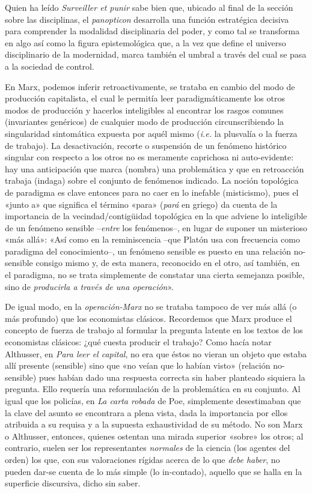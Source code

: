 Quien ha leído \emph{Surveiller et punir} sabe bien que, ubicado al final de la sección sobre las disciplinas, el \emph{panopticon} desarrolla una función estratégica decisiva para comprender la modalidad disciplinaria del poder, y como tal se transforma en algo así como la figura epistemológica que, a la vez que define el universo disciplinario de la modernidad, marca también el umbral a través del cual se pasa a la sociedad de control.

En Marx, podemos inferir retroactivamente, se trataba en cambio del modo de producción capitalista, el cual le permitía leer paradigmáticamente los otros modos de producción y hacerlos inteligibles al encontrar los rasgos comunes (invariantes genéricos) de cualquier modo de producción circunscribiendo la singularidad sintomática expuesta por aquél mismo (\emph{i.e.} la plusvalía o la fuerza de trabajo). La desactivación, recorte o suspensión de un fenómeno histórico singular con respecto a los otros no es meramente caprichosa ni auto-evidente: hay una anticipación que marca (nombra) una problemática y que en retroacción trabaja (indaga) sobre el conjunto de fenómenos indicado. La noción topológica de paradigma es clave entonces para no caer en lo inefable (misticismo), pues el «junto a» que significa el término «para» (\emph{pará }en griego) da cuenta de la importancia de la vecindad/contigüidad topológica en la que adviene lo inteligible de un fenómeno sensible --\emph{entre} los fenómenos--, en lugar de suponer un misterioso «más allá»: «Así como en la reminiscencia --que Platón usa con frecuencia como paradigma del conocimiento--, un fenómeno sensible es puesto en una relación no-sensible consigo mismo y, de esta manera, reconocido en el otro, así también, en el paradigma, no se trata simplemente de constatar una cierta semejanza posible, sino de \emph{producirla a través de una operación}».

De igual modo, en la \emph{operación-Marx} no se trataba tampoco de ver más allá (o más profundo) que los economistas clásicos. Recordemos que Marx produce el concepto de fuerza de trabajo al formular la pregunta latente en los textos de los economistas clásicos: ¿qué cuesta producir el trabajo? Como hacía notar Althusser, en \emph{Para leer el capital}, no era que éstos no vieran un objeto que estaba allí presente (sensible) sino que «no veían que lo habían visto» (relación no-sensible) pues habían dado una respuesta correcta sin haber planteado siquiera la pregunta. Ello requería una reformulación de la problemática en su conjunto. Al igual que los policías, en \emph{La carta robada} de Poe, simplemente desestimaban que la clave del asunto se encontrara a plena vista, dada la importancia por ellos atribuida a su requisa y a la supuesta exhaustividad de su método. No son Marx o Althusser, entonces, quienes ostentan una mirada superior «sobre» los otros; al contrario, suelen ser los representantes \emph{normales} de la ciencia (los agentes del orden) los que, con sus valoraciones rígidas acerca de lo que \emph{debe haber}, no pueden dar-se cuenta de lo más simple (lo in-contado), aquello que se halla en la superficie discursiva, dicho sin saber.

